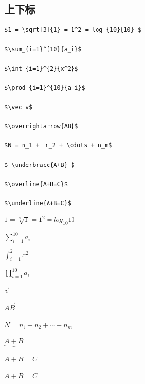 \documentclass{article}
\begin{document}
	\subsection{上下标}
	\begin{lstlisting}
$1 = \sqrt[3]{1} = 1^2 = log_{10}{10} $

$\sum_{i=1}^{10}{a_i}$

$\int_{i=1}^{2}{x^2}$

$\prod_{i=1}^{10}{a_i}$

$\vec v$

$\overrightarrow{AB}$

$N = n_1 +　n_2 + \cdots + n_m$

$ \underbrace{A+B} $

$\overline{A+B=C}$

$\underline{A+B=C}$
	\end{lstlisting}
	
	$1 = \sqrt[3]{1} = 1^2 = log_{10}{10} $
		
	$\sum_{i=1}^{10}{a_i}$
	
	$\int_{i=1}^{2}{x^2}$
	
	$\prod_{i=1}^{10}{a_i}$
	
	$\vec v$
	
	$\overrightarrow{AB}$
	
	$N = n_1 +　n_2 + \cdots + n_m$
	
	$ \underbrace{A+B} $
	
	$\overline{A+B=C}$
	
	$\underline{A+B=C}$
	
	
\end{document}
